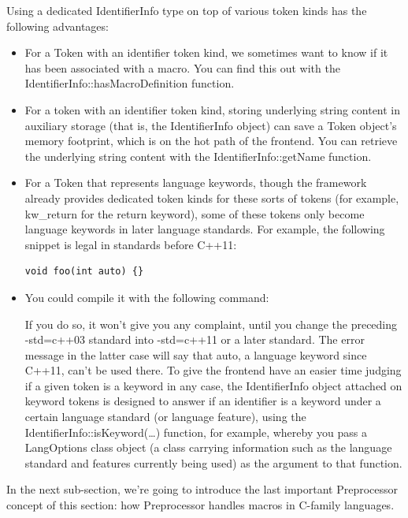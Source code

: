 Using a dedicated IdentifierInfo type on top of various token kinds has the following advantages:

\begin{itemize}
\item For a Token with an identifier token kind, we sometimes want to know if it has been associated with a macro. You can find this out with the IdentifierInfo::hasMacroDefinition function.

\item For a token with an identifier token kind, storing underlying string content in auxiliary storage (that is, the IdentifierInfo object) can save a Token object's memory footprint, which is on the hot path of the frontend. You can retrieve the underlying string content with the IdentifierInfo::getName function.

\item For a Token that represents language keywords, though the framework already provides dedicated token kinds for these sorts of tokens (for example, kw\_return for the return keyword), some of these tokens only become language keywords in later language standards. For example, the following snippet is legal in standards before C++11:
\begin{lstlisting}[style=styleCXX]
void foo(int auto) {}
\end{lstlisting}

\item You could compile it with the following command:
If you do so, it won't give you any complaint, until you change the preceding -std=c++03 standard into -std=c++11 or a later standard. The error message in the latter case will say that auto, a language keyword since C++11, can't be used there. To give the frontend have an easier time judging if a given token is a keyword in any case, the IdentifierInfo object attached on keyword tokens is designed to answer if an identifier is a keyword under a certain language standard (or language feature), using the IdentifierInfo::isKeyword(…) function, for example, whereby you pass a LangOptions class object (a class carrying information such as the language standard and features currently being used) as the argument to that function.

\end{itemize}

In the next sub-section, we're going to introduce the last important Preprocessor concept of this section: how Preprocessor handles macros in C-family languages.

